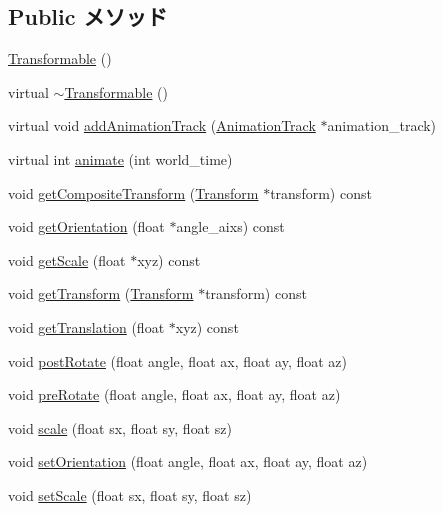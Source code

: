 \subsection*{Public メソッド}
\begin{CompactItemize}
\item 
\hyperlink{classm3g_1_1Transformable_ca6563203e3e883391c9d0927028aa04}{Transformable} ()
\item 
virtual \hyperlink{classm3g_1_1Transformable_89d9c7912ed11a30a312fd8f72b9ab22}{$\sim$Transformable} ()
\item 
virtual void \hyperlink{classm3g_1_1Transformable_415c0b110f95410ded9b85e5d99a496b}{addAnimationTrack} (\hyperlink{classm3g_1_1AnimationTrack}{AnimationTrack} $\ast$animation\_\-track)
\item 
virtual int \hyperlink{classm3g_1_1Transformable_8aad1ceab4c2a03609c8a42324ce484d}{animate} (int world\_\-time)
\item 
void \hyperlink{classm3g_1_1Transformable_263ef66efed11b7f9678e2e4bbec4c55}{getCompositeTransform} (\hyperlink{classm3g_1_1Transform}{Transform} $\ast$transform) const 
\item 
void \hyperlink{classm3g_1_1Transformable_06125ab0d85ef8c5c7ace9ced04993f3}{getOrientation} (float $\ast$angle\_\-aixs) const 
\item 
void \hyperlink{classm3g_1_1Transformable_b8a2dd11d0ba90e138625eb86a6a6083}{getScale} (float $\ast$xyz) const 
\item 
void \hyperlink{classm3g_1_1Transformable_73f387f99c527b382c8aaa54b8af6ed6}{getTransform} (\hyperlink{classm3g_1_1Transform}{Transform} $\ast$transform) const 
\item 
void \hyperlink{classm3g_1_1Transformable_d8aec42959fecc3d76f9539d3afa3c8d}{getTranslation} (float $\ast$xyz) const 
\item 
void \hyperlink{classm3g_1_1Transformable_4abf135257f132cdf9580f3a3e11ea6c}{postRotate} (float angle, float ax, float ay, float az)
\item 
void \hyperlink{classm3g_1_1Transformable_718b606184672eec83263ad44d5c7431}{preRotate} (float angle, float ax, float ay, float az)
\item 
void \hyperlink{classm3g_1_1Transformable_d94deaf828db5e2dfd5e40db42b64cd9}{scale} (float sx, float sy, float sz)
\item 
void \hyperlink{classm3g_1_1Transformable_980a9a2b5f6102763042e616d3aa4606}{setOrientation} (float angle, float ax, float ay, float az)
\item 
void \hyperlink{classm3g_1_1Transformable_937d04042c25021532ea2532fe5e3a32}{setScale} (float sx, float sy, float sz)

\end{CompactItemize}
